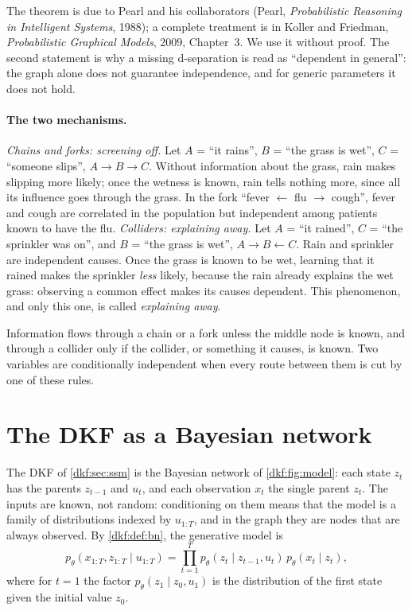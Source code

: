 \begin{notechapter}
The theorem is due to Pearl and his collaborators (Pearl, \emph{Probabilistic Reasoning in
Intelligent Systems}, 1988); a complete treatment is in Koller and Friedman, \emph{Probabilistic
Graphical Models}, 2009, Chapter~3. We use it without proof. The second statement is why a
missing d-separation is read as ``dependent in general'': the graph alone does not
guarantee independence, and for generic parameters it does not hold.

\paragraph{The two mechanisms.} \emph{Chains and forks: screening off.} Let $A$ = ``it rains'',
$B$ = ``the grass is wet'', $C$ = ``someone slips'', $A\to B\to C$. Without information about the grass,
rain makes slipping more likely; once the wetness is known, rain tells nothing more, since all
its influence goes through the grass. In the fork ``fever $\leftarrow$ flu $\to$ cough'', fever and cough are
correlated in the population but independent among patients known to have the flu.
\emph{Colliders: explaining away.} Let $A$ = ``it rained'', $C$ = ``the sprinkler was on'', and $B$ = ``the
grass is wet'', $A\to B\leftarrow C$. Rain and sprinkler are independent causes. Once the grass is known to be
wet, learning that it rained makes the sprinkler \emph{less} likely, because the rain already
explains the wet grass: observing a common effect makes its causes dependent. This
phenomenon, and only this one, is called \emph{explaining away}.

\begin{intuition}
Information flows through a chain or a fork unless the middle node is known, and through
a collider only if the collider, or something it causes, is known. Two variables are
conditionally independent when every route between them is cut by one of these rules.
\end{intuition}

\section{The DKF as a Bayesian network}\label{dkf:sec:model}

The DKF of \cref{dkf:sec:ssm} is the Bayesian network of \cref{dkf:fig:model}: each state $z_t$ has the
parents $z_{t-1}$ and $u_t$, and each observation $x_t$ the single parent $z_t$. The inputs are known, not
random: conditioning on them means that the model is a family of distributions indexed by
$u_{1:T}$, and in the graph they are nodes that are always observed. By \cref{dkf:def:bn}, the
generative model is
\begin{equation}\label{dkf:eq:generative}
  p_\theta(x_{1:T}, z_{1:T}\mid u_{1:T}) = \prod_{t=1}^Tp_\theta(z_t\mid z_{t-1}, u_t)\,p_\theta(x_t\mid z_t),
\end{equation}
where for $t = 1$ the factor $p_\theta(z_1\mid z_0, u_1)$ is the distribution of the first state given the initial value $z_0$.


\end{notechapter}
